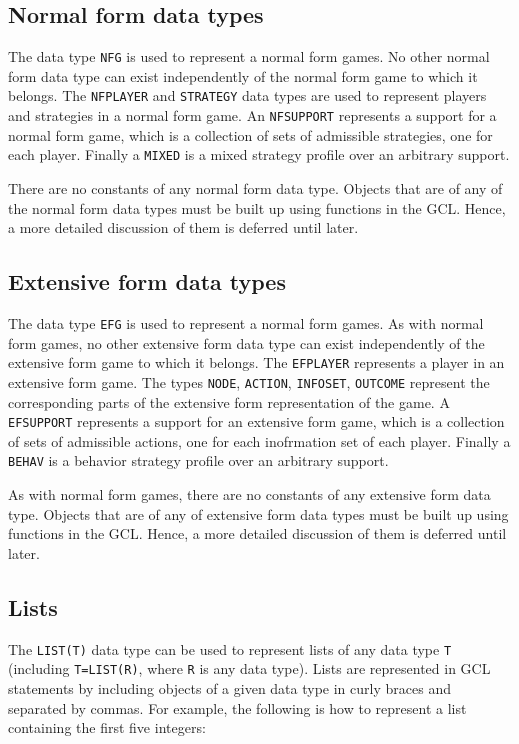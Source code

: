 \subsection{Normal form data types}

The data type \verb+NFG+ is used to represent a normal form games.  No
other normal form data type can exist independently of the normal form
game to which it belongs.  The \verb+NFPLAYER+ and \verb+STRATEGY+
data types are used to represent players and strategies in a normal
form game.  An \verb+NFSUPPORT+ represents a support for a normal form
game, which is a collection of sets of admissible strategies, one for
each player.  Finally a \verb+MIXED+ is a mixed strategy profile over
an arbitrary support.

There are no constants of any normal form data type.  Objects that are
of any of the normal form data types must be built up using functions
in the GCL.  Hence, a more detailed discussion of them is deferred
until later.  

\subsection{Extensive form data types}

The data type \verb+EFG+ is used to represent a normal form games.  As
with normal form games, no other extensive form data type can exist
independently of the extensive form game to which it belongs.  The
\verb+EFPLAYER+ represents a player in an extensive form game.  The
types \verb+NODE+, \verb+ACTION+, \verb+INFOSET+, \verb+OUTCOME+
represent the corresponding parts of the extensive form representation
of the game.  A \verb+EFSUPPORT+ represents a support for an extensive
form game, which is a collection of sets of admissible actions, one
for each inofrmation set of each player.  Finally a \verb+BEHAV+ is a
behavior strategy profile over an arbitrary support.

As with normal form games, there are no constants of any extensive form
data type.  Objects that are of any of extensive form data types must
be built up using functions in the GCL.  Hence, a more detailed
discussion of them is deferred until later.

\subsection{Lists}

The \verb+LIST(T)+ data type can be used to represent lists of any
data type \verb+T+ (including \verb+T=LIST(R)+, where \verb+R+ is any
data type).  Lists are represented in GCL statements by including
objects of a given data type in curly braces and separated by commas.
For example, the following is how to represent a list containing the
first five integers:

